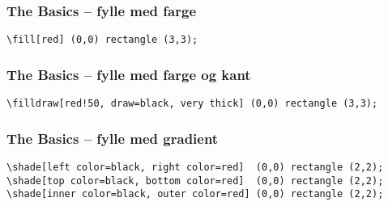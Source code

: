 \documentclass{beamer}
\begin{document}
\begin{frame}[fragile]
\frametitle{The Basics -- fylle med farge}
\begin{center}
\begin{center}
\end{center}
\end{center}

\vspace{20pt}

\begin{Verbatim}[fontsize=\small]
\fill[red] (0,0) rectangle (3,3);
\end{Verbatim}

\end{frame}

\begin{frame}[fragile]
\frametitle{The Basics -- fylle med farge og kant}
\begin{center}
\end{center}


\vspace{20pt}

\begin{Verbatim}[fontsize=\footnotesize]
\filldraw[red!50, draw=black, very thick] (0,0) rectangle (3,3);
\end{Verbatim}

\end{frame}

\begin{frame}[fragile]
\frametitle{The Basics -- fylle med gradient}
\begin{center}
\end{center}

\vspace{20pt}

\begin{Verbatim}[fontsize=\footnotesize]
\shade[left color=black, right color=red]  (0,0) rectangle (2,2);
\shade[top color=black, bottom color=red]  (0,0) rectangle (2,2);
\shade[inner color=black, outer color=red] (0,0) rectangle (2,2);
\end{Verbatim}

\end{frame}
\end{document}
